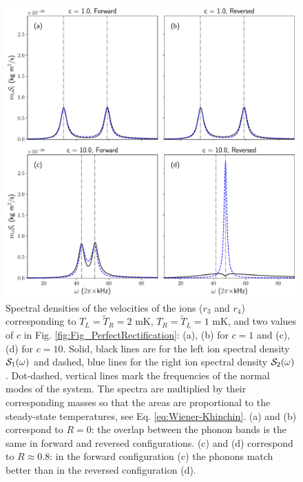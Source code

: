 \begin{figure}[t]
  \includegraphics[width=.8\linewidth]{Figures/SpectrumComparative.pdf}
  \caption{Spectral densities of the velocities of the ions ($r_3$ and $r_4$) corresponding to $T_L=\tilde{T}_R=2$ mK, $T_R=\tilde{T}_L=1$ mK, and  two values of $c$ in Fig. \ref{fig:Fig_PerfectRectification}: (a), (b) for $c=1$ and (c), (d) for $c=10$. Solid, black lines are for the left ion spectral density ${\cal{S}}_1(\omega)$ and dashed, blue lines for the right ion spectral density
 ${\cal{S}}_2(\omega)$. Dot-dashed, vertical lines mark the frequencies of the normal modes of the system. The spectra are multiplied by their corresponding masses so that  the areas are proportional to the steady-state temperatures, see  Eq. \eqref{eq:Wiener-Khinchin}. (a) and (b) correspond to $R = 0$:  the overlap between the phonon bands is the same in forward and reversed configurations. (c) and (d) correspond to $R\approx 0.8$:  in the forward configuration (c)  the phonons match better than in the reversed configuration (d).}
  \label{fig:Figure_Spectra}
\end{figure}

